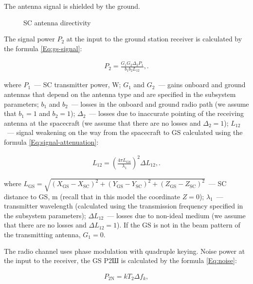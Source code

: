 \documentclass[12pt,a4paper]{article}
\begin{document}
The antenna signal is shielded by the ground.

\begin{figure}[tbh]
  \begin{center}
    \caption{SC antenna directivity}
    \label{Pic:Radio}
  \end{center}
\end{figure}

The signal power $P_2$ at the input to the ground station receiver is calculated by the formula
\ref{Eq:gs-signal}:

\begin{eqnarray}
P_2 = \frac{G_1 G_2 \Delta_2 P_1}{b_1 b_2 L_{12}}, \label{Eq:gs-signal}.
\end{eqnarray}

where $P_1$~--- SC transmitter power, W; $G_1$ and $G_2$~--– gains onboard and ground
antennas that depend on the antenna type and are specified in the subsystem parameters; $b_1$ and $b_2$~--–
losses in the onboard and ground radio path (we assume that $b_1 = 1$ and $b_2 = 1$);
$\Delta_2$~--– losses due to inaccurate pointing of the receiving antenna at the spacecraft (we assume that
there are no losses and $\Delta_2 = 1$); $L_{12}$~--– signal weakening on the way from the spacecraft to
GS calculated using the formula \ref{Eq:signal-attenuation}:

\begin{eqnarray}
L_{12} = \left( \frac{4 \pi L_{\text{GS}}}{\lambda_1} \right)^2 \Delta L_{12}, \label{Eq:signal-attenuation}.
\end{eqnarray}

where $L_{\text{GS}} = \sqrt{(X_{\text{GS}} - X_{\text{SC}})^2 + (Y_{\text{GS}} -
  Y_{\text{SC}})^2 + (Z_{\text{GS}} - Z_{\text{SC}})^2}$~--- SC distance to GS, m (recall that in this model the coordinate $ Z = 0$); $\lambda_1$~--- transmitter wavelength (calculated using the transmission frequency specified in the subsystem parameters); $\Delta L_{12}$~--- losses due to non-ideal medium (we assume that there are no losses and $\Delta L_{12} = 1$). If the GS is not in the beam pattern of the transmitting antenna, $G_1 = 0$.

The radio channel uses phase modulation with quadruple keying. Noise power
at the input to the receiver, the GS P2Ш is calculated by the formula \ref{Eq:noise}:

\begin{eqnarray}
P_{2\text{N}} = k T_2 \Delta f_k, \label{Eq:noise}
\end{eqnarray}
\end{document}

